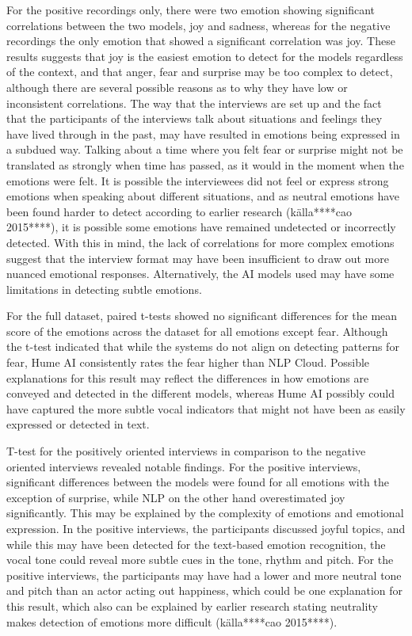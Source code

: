For the positive recordings only, there were two emotion showing significant correlations between the two models, joy and sadness, whereas for the negative recordings the only emotion that showed a significant correlation was joy. These results suggests that joy is the easiest emotion to detect for the models regardless of the context, and that anger, fear and surprise may be too complex to detect, although there are several possible reasons as to why they have low or inconsistent correlations. The way that the interviews are set up and the fact that the participants of the interviews talk about situations and feelings they have lived through in the past, may have resulted in emotions being expressed in a subdued way. Talking about a time where you felt fear or surprise might not be translated as strongly when time has passed, as it would in the moment when the emotions were felt. It is possible the interviewees did not feel or express strong emotions when speaking about different situations, and as neutral emotions have been found harder to detect according to earlier research (källa****cao 2015****), it is possible some emotions have remained undetected or incorrectly detected. With this in mind, the lack of correlations for more complex emotions suggest that the interview format may have been insufficient to draw out more nuanced emotional responses. Alternatively, the AI models used may have some limitations in detecting subtle emotions.

For the full dataset, paired t-tests showed no significant differences for the mean score of the emotions across the dataset for all emotions except fear. Although the t-test indicated that while the systems do not align on detecting patterns for fear, Hume AI consistently rates the fear higher than NLP Cloud. Possible explanations for this result may reflect the differences in how emotions are conveyed and detected in the different models, whereas Hume AI possibly could have captured the more subtle vocal indicators that might not have been as easily expressed or detected in text.

T-test for the positively oriented interviews in comparison to the negative oriented interviews revealed notable findings. For the positive interviews, significant differences between the models were found for all emotions with the exception of surprise, while NLP on the other hand overestimated joy significantly.
This may be explained by the complexity of emotions and emotional expression. In the positive interviews, the participants discussed joyful topics, and while this may have been detected for the text-based emotion recognition, the vocal tone could reveal more subtle cues in the tone, rhythm and pitch. For the positive interviews, the participants may have had a lower and more neutral tone and pitch than an actor acting out happiness, which could be one explanation for this result, which also can be explained by earlier research stating neutrality makes detection of emotions more difficult  (källa****cao 2015****).

